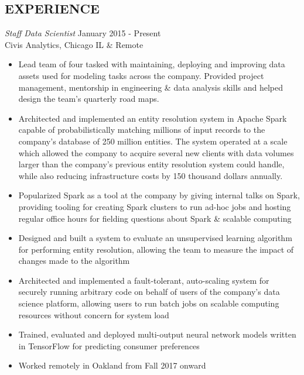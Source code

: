 \documentclass[line,margin]{res}
\begin{document}
\address{waltaskew@gmail.com}
\address{404-819-9796}

\begin{resume}

\section{EXPERIENCE}
        {\sl Staff Data Scientist} \hfill January 2015 - Present \\
        Civis Analytics, Chicago IL \& Remote
        \begin{itemize}
          \item Lead team of four tasked with maintaining, deploying
            and improving data assets used for modeling tasks across
            the company. Provided project management, mentorship in
            engineering \& data analysis skills and helped design the
            team's quarterly road maps.
          \item Architected and implemented an entity resolution
            system in Apache Spark capable of probabilistically
            matching millions of input records to the company's
            database of 250 million entities.
            The system operated at a scale which allowed the company
            to acquire several new clients with data volumes larger
            than the company's previous entity resolution system could
            handle, while also reducing infrastructure costs by 150
            thousand dollars annually.
          \item Popularized Spark as a tool at the company by giving
            internal talks on Spark, providing tooling for creating
            Spark clusters to run ad-hoc jobs and hosting regular
            office hours for fielding questions about Spark \&
            scalable computing
          \item Designed and built a system to evaluate an unsupervised
            learning algorithm for performing entity resolution,
            allowing the team to measure the impact of changes made to
            the algorithm
          \item Architected and implemented a fault-tolerant,
            auto-scaling system for securely running arbitrary code on
            behalf of users of the company's data science platform,
            allowing users to run batch jobs on scalable computing
            resources without concern for system load
          \item Trained, evaluated and deployed multi-output neural
            network models written in TensorFlow for predicting
            consumer preferences
          \item Worked remotely in Oakland from Fall 2017 onward
        \end{itemize}


\end{resume}
\end{document}
